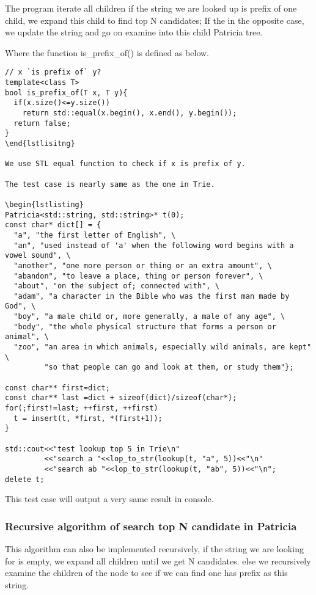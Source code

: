 \documentclass{article}
\begin{document}
The program iterate all children if the string we are looked up is
prefix of one child, we expand this child to find top N candidates; If
the in the opposite case, we update the string and go on examine into
this child Patricia tree.

Where the function is\_prefix\_of() is defined as below.

\begin{lstlisting}
// x `is prefix of` y?
template<class T>
bool is_prefix_of(T x, T y){
  if(x.size()<=y.size())
    return std::equal(x.begin(), x.end(), y.begin());
  return false;
}
\end{lstlisitng}

We use STL equal function to check if x is prefix of y. 

The test case is nearly same as the one in Trie.

\begin{lstlisting}
Patricia<std::string, std::string>* t(0);
const char* dict[] = {
  "a", "the first letter of English", \
  "an", "used instead of 'a' when the following word begins with a vowel sound", \
  "another", "one more person or thing or an extra amount", \
  "abandon", "to leave a place, thing or person forever", \
  "about", "on the subject of; connected with", \
  "adam", "a character in the Bible who was the first man made by God", \
  "boy", "a male child or, more generally, a male of any age", \
  "body", "the whole physical structure that forms a person or animal", \
  "zoo", "an area in which animals, especially wild animals, are kept" \
         "so that people can go and look at them, or study them"};

const char** first=dict;
const char** last =dict + sizeof(dict)/sizeof(char*);
for(;first!=last; ++first, ++first)
  t = insert(t, *first, *(first+1));
}

std::cout<<"test lookup top 5 in Trie\n"
         <<"search a "<<lop_to_str(lookup(t, "a", 5))<<"\n"
         <<"search ab "<<lop_to_str(lookup(t, "ab", 5))<<"\n";
delete t;
\end{lstlisting}

This test case will output a very same result in console.

\subsubsection{Recursive algorithm of search top N candidate in
  Patricia}

This algorithm can also be implemented recursively, if the string we
are looking for is empty, we expand all children until we get N
candidates. else we recursively examine the children of the node to
see if we can find one has prefix as this string.
\end{document}
